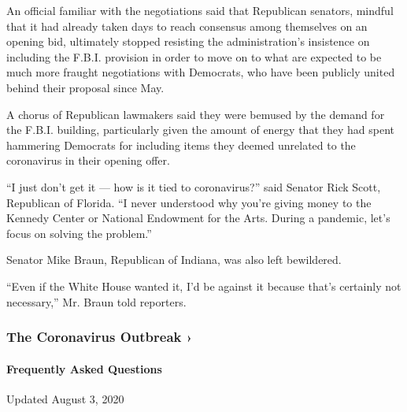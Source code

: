 An official familiar with the negotiations said that Republican
senators, mindful that it had already taken days to reach consensus
among themselves on an opening bid, ultimately stopped resisting the
administration's insistence on including the F.B.I. provision in order
to move on to what are expected to be much more fraught negotiations
with Democrats, who have been publicly united behind their proposal
since May.

A chorus of Republican lawmakers said they were bemused by the demand
for the F.B.I. building, particularly given the amount of energy that
they had spent hammering Democrats for including items they deemed
unrelated to the coronavirus in their opening offer.

``I just don't get it --- how is it tied to coronavirus?'' said Senator
Rick Scott, Republican of Florida. ``I never understood why you're
giving money to the Kennedy Center or National Endowment for the Arts.
During a pandemic, let's focus on solving the problem.''

Senator Mike Braun, Republican of Indiana, was also left bewildered.

``Even if the White House wanted it, I'd be against it because that's
certainly not necessary,'' Mr. Braun told reporters.

\href{https://www.nytimes.com/news-event/coronavirus?action=click\&pgtype=Article\&state=default\&region=MAIN_CONTENT_3\&context=storylines_faq}{}

\hypertarget{the-coronavirus-outbreak-}{%
\subsubsection{The Coronavirus Outbreak
›}\label{the-coronavirus-outbreak-}}

\hypertarget{frequently-asked-questions}{%
\paragraph{Frequently Asked
Questions}\label{frequently-asked-questions}}

Updated August 3, 2020

